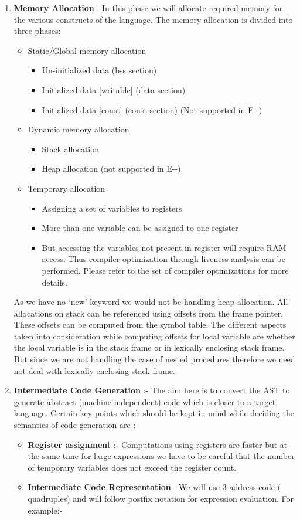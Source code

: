 \documentclass{sigchi}
\begin{document}
\begin{enumerate}
\item {\bf Memory Allocation} : In this phase we will allocate required memory for the various constructs of the language. The memory allocation is divided into three phases:
	\begin{itemize}
    	\item Static/Global memory allocation
        	\begin{itemize}
				\item Un-initialized data (bss section)
				\item Initialized data [writable] (data section)
				\item Initialized data [const] (const section) (Not supported in E-{}-)
			\end{itemize}
         \item Dynamic memory allocation
			\begin{itemize}
          		\item Stack allocation
				\item Heap allocation (not supported in E-{}-)
            \end{itemize}
		\item Temporary allocation
			\begin{itemize}
            	\item Assigning a set of variables to registers
				\item More than  one variable can be assigned to one register
				\item But accessing the variables not present in register will require RAM access. Thus compiler optimization through liveness analysis can be performed. Please refer to the set of compiler optimizations for more details.
			\end{itemize}
    \end{itemize}
    As we have no ‘new’ keyword we would not be handling heap allocation. All allocations on stack can be referenced using offsets from the frame pointer. These offsets can be computed from the symbol table. The different aspects taken into consideration while computing offsets for local variable are whether the local variable is in the stack frame or in lexically enclosing stack frame. But since we are not handling the case of nested procedures therefore we need not deal with lexically enclosing stack frame.

\item {\bf Intermediate Code Generation} :-
The aim here is to convert the AST to generate abstract (machine independent) code which is closer to a target language. Certain key points which should be kept in mind while deciding the semantics of code generation are :-
	\begin{itemize}
 		\item \textbf{Register assignment} :- Computations using registers are faster but at the same time for large expressions we have to be careful that the number of temporary variables does not exceed the register count.
		\item \textbf{Intermediate Code Representation} : We will use 3 address code ( quadruples) and will follow postfix notation for expression evaluation. For example:-
		

\end{itemize}
\end{enumerate}
\end{document}
